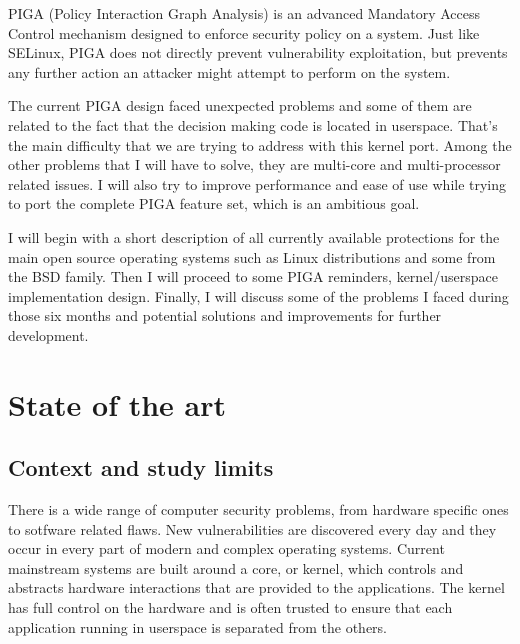 \documentclass[pdftex,a4paper,titlepage,11pt]{article}
\begin{document}
\bigskip

PIGA (Policy Interaction Graph Analysis) is an advanced Mandatory Access Control
mechanism designed to enforce security policy on a system. Just like SELinux,
PIGA does not directly prevent vulnerability exploitation, but prevents any
further action an attacker might attempt to perform on the system.

\bigskip

The current PIGA design faced unexpected problems and some of them are related
to the fact that the decision making code is located in userspace. That's the
main difficulty that we are trying to address with this kernel port. Among the
other problems that I will have to solve, they are multi-core and
multi-processor related issues. I will also try to improve performance and ease
of use while trying to port the complete PIGA feature set, which is an
ambitious goal.

\bigskip

I will begin with a short description of all currently available protections for
the main open source operating systems such as Linux distributions and some from
the BSD family. Then I will proceed to some PIGA reminders, kernel/userspace
implementation design. Finally, I will discuss some of the problems I faced
during those six months and potential solutions and improvements for further
development.


\newpage

\section{State of the art}

\subsection{Context and study limits}


There is a wide range of computer security problems, from hardware specific ones
to sotfware related flaws. New vulnerabilities are discovered every day and they
occur in every part of modern and complex operating systems. Current mainstream
systems are built around a core, or kernel, which controls and abstracts
hardware interactions that are provided to the applications. The kernel has full
control on the hardware and is often trusted to ensure that each application
running in userspace is separated from the others.
\end{document}
